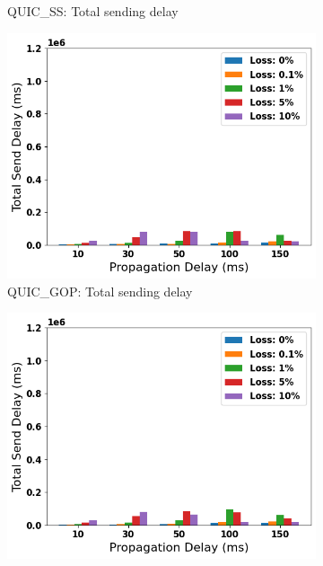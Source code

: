 \documentclass{mpaper}
\begin{document}
\begin{figure}
\begin{subfigure}[b]{0.32\textwidth}
      \caption{QUIC\_SS: Total sending delay}
      \label{fig:SS_SEND}
  \end{subfigure}
  \hfill
  \begin{subfigure}[b]{0.32\textwidth}
      \centering
      \includegraphics[width=\textwidth]{Total_Send/QUIC_GOP/QUIC_GOP_Total_Send_delay.png}
      \caption{QUIC\_GOP: Total sending delay}
      \label{fig:GOP_SEND}
  \end{subfigure}
  \begin{subfigure}[b]{0.32\textwidth}
      \centering
      \includegraphics[width=\textwidth]{Total_Send/QUIC_FPS/QUIC_FPS_Total_Send_delay.png}

\end{subfigure}
\end{figure}
\end{document}
